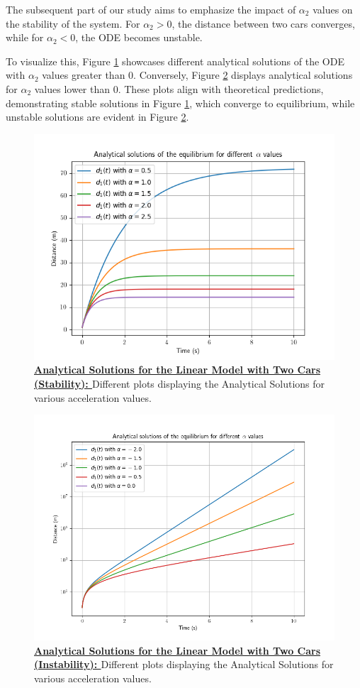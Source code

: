 \documentclass{article}
\begin{document}
		The subsequent part of our study aims to emphasize the impact of \(\alpha_2\) values on the stability of the system. For \(\alpha_2 > 0\), the distance between two cars converges, while for \(\alpha_2 < 0\), the ODE becomes unstable.
		
		To visualize this, Figure \ref{fig:AS1} showcases different analytical solutions of the ODE with \(\alpha_2\) values greater than 0. Conversely, Figure \ref{fig:AS2} displays analytical solutions for \(\alpha_2\) values lower than 0. These plots align with theoretical predictions, demonstrating stable solutions in Figure \ref{fig:AS1}, which converge to equilibrium, while unstable solutions are evident in Figure \ref{fig:AS2}.
		
		\begin{figure}[H]
			\centering
			\includegraphics[width=0.65\linewidth]{Stability.png}
			\caption[Analytical Solutions for the Linear Model with Two Cars]{\textbf{\underline{Analytical Solutions for the Linear Model with Two Cars (Stability): }}Different plots displaying the Analytical Solutions for various acceleration values.}
			\label{fig:AS1}
		\end{figure}
		
		\begin{figure}[H]
			\centering
			\includegraphics[width=0.65\linewidth]{Unstability.png}
			\caption[Analytical Solutions for the Linear Model with Two Cars]{\textbf{\underline{Analytical Solutions for the Linear Model with Two Cars (Instability): }}Different plots displaying the Analytical Solutions for various acceleration values.}
			\label{fig:AS2}
		\end{figure}
		
\end{document}
